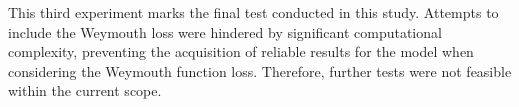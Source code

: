 This third experiment marks the final test conducted in this study. Attempts to include the Weymouth loss were hindered by significant computational complexity, preventing the acquisition of reliable results for the model when considering the Weymouth function loss. Therefore, further tests were not feasible within the current scope.



%

